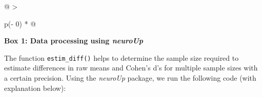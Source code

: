 \documentclass[
  letterpaper,
  DIV=11,
  numbers=noendperiod]{scrartcl}
\newenvironment{Shaded}{\begin{snugshade}}{\end{snugshade}}
\newcommand{\AttributeTok}[1]{\textcolor[rgb]{0.40,0.45,0.13}{#1}}
\newcommand{\CommentTok}[1]{\textcolor[rgb]{0.37,0.37,0.37}{#1}}
\newcommand{\DecValTok}[1]{\textcolor[rgb]{0.68,0.00,0.00}{#1}}
\newcommand{\FunctionTok}[1]{\textcolor[rgb]{0.28,0.35,0.67}{#1}}
\newcommand{\NormalTok}[1]{\textcolor[rgb]{0.00,0.23,0.31}{#1}}
\newcommand{\OtherTok}[1]{\textcolor[rgb]{0.00,0.23,0.31}{#1}}
\newcommand{\SpecialCharTok}[1]{\textcolor[rgb]{0.37,0.37,0.37}{#1}}
\newcommand{\StringTok}[1]{\textcolor[rgb]{0.13,0.47,0.30}{#1}}
\begin{document}
\begin{longtable}[]{@{}
  >{\raggedright\arraybackslash}p{}@{}}
\toprule\noalign{}
\endhead
\bottomrule\noalign{}
\endlastfoot
\textbf{Box 1: Data processing using \emph{neuroUp}} \\
\begin{minipage}[t]{\linewidth}\raggedright
The function \texttt{estim\_diff()} helps to determine the sample size
required to estimate differences in raw means and Cohen's d's for
multiple sample sizes with a certain precision. Using the \emph{neuroUp}
package, we run the following code (with explanation below):

\begin{Shaded}
\end{Shaded}


\end{minipage}
\end{longtable}
\end{document}
